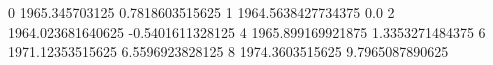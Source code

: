 0 1965.345703125 0.7818603515625
1 1964.5638427734375 0.0
2 1964.023681640625 -0.5401611328125
4 1965.899169921875 1.3353271484375
6 1971.12353515625 6.5596923828125
8 1974.3603515625 9.7965087890625
